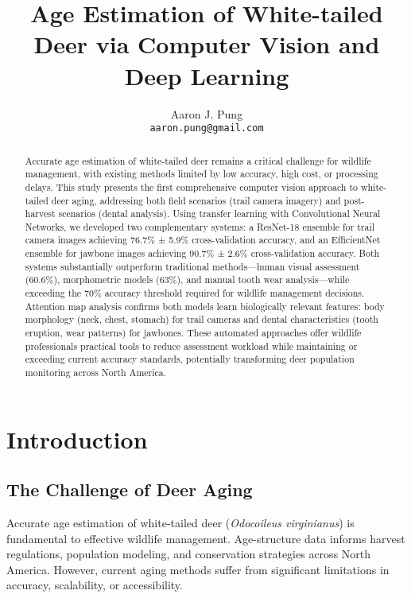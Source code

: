 \documentclass[11pt]{article}
\title{Age Estimation of White-tailed Deer via Computer Vision and Deep Learning}
\author{Aaron J. Pung\\
\texttt{aaron.pung@gmail.com}}
\date{}
\begin{document}
\maketitle

\begin{abstract}
Accurate age estimation of white-tailed deer remains a critical challenge for wildlife management, with existing methods limited by low accuracy, high cost, or processing delays. This study presents the first comprehensive computer vision approach to white-tailed deer aging, addressing both field scenarios (trail camera imagery) and post-harvest scenarios (dental analysis). Using transfer learning with Convolutional Neural Networks, we developed two complementary systems: a ResNet-18 ensemble for trail camera images achieving 76.7\% ± 5.9\% cross-validation accuracy, and an EfficientNet ensemble for jawbone images achieving 90.7\% ± 2.6\% cross-validation accuracy. Both systems substantially outperform traditional methods—human visual assessment (60.6\%), morphometric models (63\%), and manual tooth wear analysis—while exceeding the 70\% accuracy threshold required for wildlife management decisions. Attention map analysis confirms both models learn biologically relevant features: body morphology (neck, chest, stomach) for trail cameras and dental characteristics (tooth eruption, wear patterns) for jawbones. These automated approaches offer wildlife professionals practical tools to reduce assessment workload while maintaining or exceeding current accuracy standards, potentially transforming deer population monitoring across North America.
\end{abstract}

\section{Introduction}

\subsection{The Challenge of Deer Aging}

Accurate age estimation of white-tailed deer (\textit{Odocoileus virginianus}) is fundamental to effective wildlife management. Age-structure data informs harvest regulations, population modeling, and conservation strategies across North America. However, current aging methods suffer from significant limitations in accuracy, scalability, or accessibility.
\end{document}
